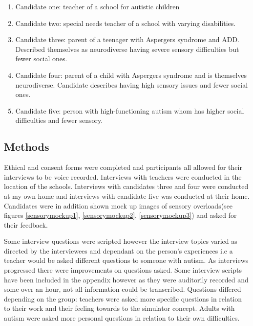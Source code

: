\documentclass[11pt]{report}
\begin{document}
\begin{enumerate}
\item Candidate one: teacher of a school for autistic children
\item Candidate two: special needs teacher of a school with varying disabilities.
\item Candidate three: parent of a teenager with Aspergers syndrome and ADD. Described themselves as neurodiverse having severe sensory difficulties but fewer social ones.
\item Candidate four: parent of a child with Aspergers syndrome and is themselves neurodiverse. Candidate describes having high sensory issues and fewer social ones.
\item Candidate five: person with high-functioning autism whom has higher social difficulties and fewer sensory.
\end{enumerate}


\subsection{Methods}
Ethical and consent forms were completed and participants all allowed for their interviews to be voice recorded. Interviews with teachers were conducted in the location of the schools. Interviews with candidates three and four were conducted at my own home and interviews with candidate five was conducted at their home. Candidates were in addition shown mock up images of sensory overloads(see figures \ref{sensorymockup1}, \ref{sensorymockup2}, \ref{sensorymockup3}) and asked for their feedback. 

Some interview questions were scripted however the interview topics varied as directed by the interviewees and dependant on the person's experiences i.e a teacher would be asked different questions to someone with autism. As interviews progressed there were improvements on questions asked. Some interview scripts have been included in the appendix however as they were auditorily recorded and some over an hour, not all information could be transcribed. Questions differed depending on the group: teachers were asked more specific questions in relation to their work and their feeling towards to the simulator concept. Adults with autism were asked more personal questions in relation to their own difficulties. 
\end{document}
